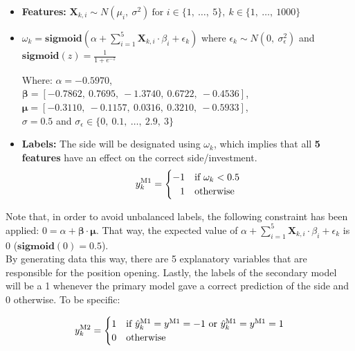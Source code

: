 \documentclass[a4paper]{article}
\begin{document}
\begin{itemize}

	\item \textbf{Features:} $\textbf{X}_{k,i} \sim 
	N(\mu_i,\ \sigma^2)\ \text{for } i \in \{1,\ \ldots,\ 5\},\ 
	k \in \{1,\ \ldots,\ 1000\}$
	
	\item $\omega_k = \textbf{sigmoid} \left( \alpha + 
	\sum_{i = 1}^{5} \textbf{X}_{k,i} \cdot \beta_i + \epsilon_k 
	\right)$ where $\epsilon_k \sim N(0,\ \sigma_{\epsilon}^2)$ 
	and $\textbf{sigmoid}(z) = \frac{1}{1 + e^{-z}}$
	
	\vspace{.1cm}

	Where: $\alpha = -0.5970$, \\
	$\mathbold{\beta}=[-0.7862,\ 0.7695,\ -1.3740,\  0.6722,\ -0.4536]
	$,\\
	$\mathbold{\mu} = [-0.3110,\ -0.1157,\ 0.0316,\ 0.3210,\ -0.5933]
	$,\\
	$\sigma = 0.5$ and $\sigma_\epsilon \in 
	\{0,\ 0.1,\ \ldots,\ 2.9,\ 3\}$\\
	
	
	\item \textbf{Labels:} The side will be designated using 
	$\omega_k$, which implies that all \textbf{5 features} have an 
	effect on the correct side/investment.
	\begin{equation*}
		y_k^{\text{M1}} =
	    \begin{cases}
	      -1 & \text{if}\ \omega_k < 0.5 \\
	      \hfill 1 & \text{otherwise} 
	    \end{cases}
	\end{equation*}
\end{itemize}

Note that, in order to avoid unbalanced labels, the following 
constraint has been applied: 
$0 = \alpha + \mathbold{\beta \cdot \mu}$. 
That way, the expected value of $\alpha + \sum_{i = 1}^{5} 
\textbf{X}_{k,i} \cdot \beta_i + \epsilon_k$ is 0 ($\textbf{sigmoid}
(0) = 0.5$).\\

By generating data this way, there are 5 explanatory variables that 
are responsible for the position opening. Lastly, the labels of the 
secondary model will be a 1 whenever the primary model gave a correct 
prediction of the side and 0 otherwise. To be specific:

\begin{equation*}
	y_k^{\text{M2}} =
    \begin{cases}
      1 & \text{if}\ \hat{y}^{\text{M1}}_k = 
      y^{\text{M1}}= -1\ \text{or}\ 
      \hat{y}^{\text{M1}}_k = 
      y^{\text{M1}}= 1\\
      \hfill 0 & \text{otherwise} 
    \end{cases}
\end{equation*}
\end{document}
